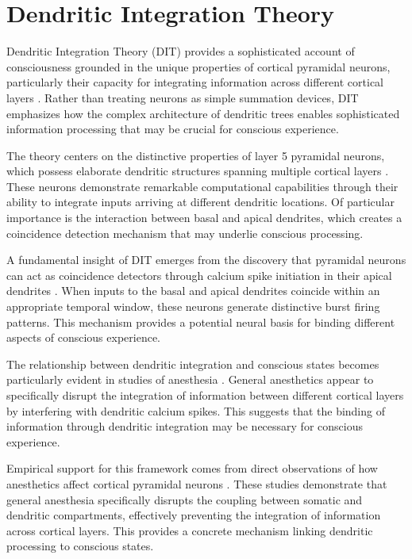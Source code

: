 \section{Dendritic Integration Theory}

Dendritic Integration Theory (DIT) provides a sophisticated account of consciousness grounded in the unique properties of cortical pyramidal neurons, particularly their capacity for integrating information across different cortical layers \cite{Larkum2009}. Rather than treating neurons as simple summation devices, DIT emphasizes how the complex architecture of dendritic trees enables sophisticated information processing that may be crucial for conscious experience.

The theory centers on the distinctive properties of layer 5 pyramidal neurons, which possess elaborate dendritic structures spanning multiple cortical layers \cite{Major2013}. These neurons demonstrate remarkable computational capabilities through their ability to integrate inputs arriving at different dendritic locations. Of particular importance is the interaction between basal and apical dendrites, which creates a coincidence detection mechanism that may underlie conscious processing.

A fundamental insight of DIT emerges from the discovery that pyramidal neurons can act as coincidence detectors through calcium spike initiation in their apical dendrites \cite{Larkum2013}. When inputs to the basal and apical dendrites coincide within an appropriate temporal window, these neurons generate distinctive burst firing patterns. This mechanism provides a potential neural basis for binding different aspects of conscious experience.

The relationship between dendritic integration and conscious states becomes particularly evident in studies of anesthesia \cite{Phillips2018}. General anesthetics appear to specifically disrupt the integration of information between different cortical layers by interfering with dendritic calcium spikes. This suggests that the binding of information through dendritic integration may be necessary for conscious experience.

Empirical support for this framework comes from direct observations of how anesthetics affect cortical pyramidal neurons \cite{Suzuki2020}. These studies demonstrate that general anesthesia specifically disrupts the coupling between somatic and dendritic compartments, effectively preventing the integration of information across cortical layers. This provides a concrete mechanism linking dendritic processing to conscious states.

